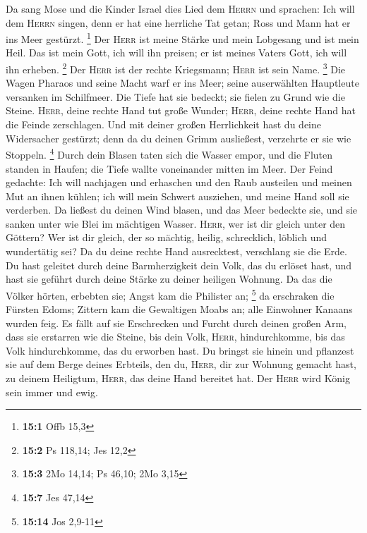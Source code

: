  Da sang Mose und die Kinder Israel dies Lied dem
\textsc{Herrn} und sprachen: Ich will dem \textsc{Herrn} singen, denn er
hat eine herrliche Tat getan; Ross und Mann hat er ins Meer gestürzt.
\footnote{\textbf{15:1} Offb 15,3}  Der \textsc{Herr} ist
meine Stärke und mein Lobgesang und ist mein Heil. Das ist mein Gott,
ich will ihn preisen; er ist meines Vaters Gott, ich will ihn erheben.
\footnote{\textbf{15:2} Ps 118,14; Jes 12,2}  Der
\textsc{Herr} ist der rechte Kriegsmann; \textsc{Herr} ist sein Name.
\footnote{\textbf{15:3} 2Mo 14,14; Ps 46,10; 2Mo 3,15} 
Die Wagen Pharaos und seine Macht warf er ins Meer; seine auserwählten
Hauptleute versanken im Schilfmeer.  Die Tiefe hat sie
bedeckt; sie fielen zu Grund wie die Steine. 
\textsc{Herr}, deine rechte Hand tut große Wunder; \textsc{Herr}, deine
rechte Hand hat die Feinde zerschlagen.  Und mit deiner
großen Herrlichkeit hast du deine Widersacher gestürzt; denn da du
deinen Grimm ausließest, verzehrte er sie wie Stoppeln. \footnote{\textbf{15:7}
  Jes 47,14}  Durch dein Blasen taten sich die Wasser
empor, und die Fluten standen in Haufen; die Tiefe wallte voneinander
mitten im Meer.  Der Feind gedachte: Ich will nachjagen
und erhaschen und den Raub austeilen und meinen Mut an ihnen kühlen; ich
will mein Schwert ausziehen, und meine Hand soll sie verderben.
 Da ließest du deinen Wind blasen, und das Meer bedeckte
sie, und sie sanken unter wie Blei im mächtigen Wasser. 
\textsc{Herr}, wer ist dir gleich unter den Göttern? Wer ist dir gleich,
der so mächtig, heilig, schrecklich, löblich und wundertätig sei?
 Da du deine rechte Hand ausrecktest, verschlang sie die
Erde.  Du hast geleitet durch deine Barmherzigkeit dein
Volk, das du erlöset hast, und hast sie geführt durch deine Stärke zu
deiner heiligen Wohnung.  Da das die Völker hörten,
erbebten sie; Angst kam die Philister an; \footnote{\textbf{15:14} Jos
  2,9-11}  da erschraken die Fürsten Edoms; Zittern kam
die Gewaltigen Moabs an; alle Einwohner Kanaans wurden feig.
 Es fällt auf sie Erschrecken und Furcht durch deinen
großen Arm, dass sie erstarren wie die Steine, bis dein Volk,
\textsc{Herr}, hindurchkomme, bis das Volk hindurchkomme, das du
erworben hast.  Du bringst sie hinein und pflanzest sie
auf dem Berge deines Erbteils, den du, \textsc{Herr}, dir zur Wohnung
gemacht hast, zu deinem Heiligtum, \textsc{Herr}, das deine Hand
bereitet hat.  Der \textsc{Herr} wird König sein immer
und ewig.

